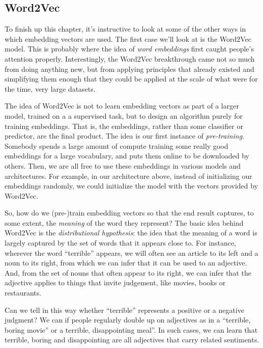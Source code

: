 \documentclass{pca}
\theoremstyle{theorem}
\theoremstyle{definition}
\theoremstyle{proof}
\begin{document}
\subsection{Word2Vec}

To finish up this chapter, it's instructive to look at some of the other ways in which embedding vectors are used. The first case we'll look at is the Word2Vec model. This is probably where the idea of \emph{word embeddings} first caught people's attention properly. Interestingly, the Word2Vec breakthrough came not so much from doing anything new, but from applying principles that already existed and simplifying them enough that they could be applied at the scale of what were for the time, very large datasets.

The idea of Word2Vec is not to learn embedding vectors as part of a larger model, trained on a a supervised task, but to design an algorithm purely for training embeddings. That is, the embeddings, rather than some classifier or predictor, are the final product. The idea is our first instance of \emph{pre-training}. Somebody spends a large amount of compute training some really good embeddings for a large vocabulary, and puts them online to be downloaded by others. Then, we are all free to use these embeddings in various models and architectures. For example, in our architecture above, instead of initializing our embeddings randomly, we could initialize the model with the vectors provided by Word2Vec.

So, how do we (pre-)train embedding vectors so that the end result captures, to some extent, the \emph{meaning} of the word they represent? The basic idea behind Word2Vec is the \emph{distributional hypothesis}: the idea that the meaning of a word is largely captured by the set of words that it appears close to. For instance, wherever the word ``terrible'' appears, we will often see an article to its left and a noun to its right, from which we can infer that it can be used to an adjective. And, from the set of nouns that often appear to its right, we can infer that the adjective applies to things that invite judgement, like movies, books or restaurants. 

Can we tell in this way whether ``terrible'' represents a positive or a negative judgment? We can if people regularly double up on adjectives as in a ``terrible, boring movie'' or a terrible, disappointing meal''. In such cases, we can learn that terrible, boring and disappointing are all adjectives that carry related sentiments. 
\end{document}
